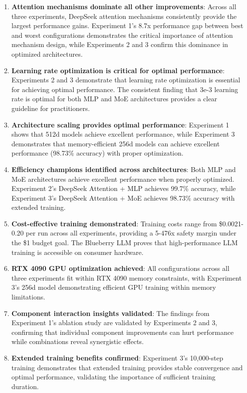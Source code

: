 \documentclass[11pt,a4paper]{article}
\begin{document}
\begin{enumerate}
    \item \textbf{Attention mechanisms dominate all other improvements}: Across all three experiments, DeepSeek attention mechanisms consistently provide the largest performance gains. Experiment 1's 8.7x performance gap between best and worst configurations demonstrates the critical importance of attention mechanism design, while Experiments 2 and 3 confirm this dominance in optimized architectures.
    
    \item \textbf{Learning rate optimization is critical for optimal performance}: Experiments 2 and 3 demonstrate that learning rate optimization is essential for achieving optimal performance. The consistent finding that 3e-3 learning rate is optimal for both MLP and MoE architectures provides a clear guideline for practitioners.
    
    \item \textbf{Architecture scaling provides optimal performance}: Experiment 1 shows that 512d models achieve excellent performance, while Experiment 3 demonstrates that memory-efficient 256d models can achieve excellent performance (98.73\% accuracy) with proper optimization.
    
    \item \textbf{Efficiency champions identified across architectures}: Both MLP and MoE architectures achieve excellent performance when properly optimized. Experiment 2's DeepSeek Attention + MLP achieves 99.7\% accuracy, while Experiment 3's DeepSeek Attention + MoE achieves 98.73\% accuracy with extended training.
    
    \item \textbf{Cost-effective training demonstrated}: Training costs range from \$0.0021-0.20 per run across all experiments, providing a 5-476x safety margin under the \$1 budget goal. The Blueberry LLM proves that high-performance LLM training is accessible on consumer hardware.
    
    \item \textbf{RTX 4090 GPU optimization achieved}: All configurations across all three experiments fit within RTX 4090 memory constraints, with Experiment 3's 256d model demonstrating efficient GPU training within memory limitations.
    
    \item \textbf{Component interaction insights validated}: The findings from Experiment 1's ablation study are validated by Experiments 2 and 3, confirming that individual component improvements can hurt performance while combinations reveal synergistic effects.
    
    \item \textbf{Extended training benefits confirmed}: Experiment 3's 10,000-step training demonstrates that extended training provides stable convergence and optimal performance, validating the importance of sufficient training duration.
\end{enumerate}
\end{document}
